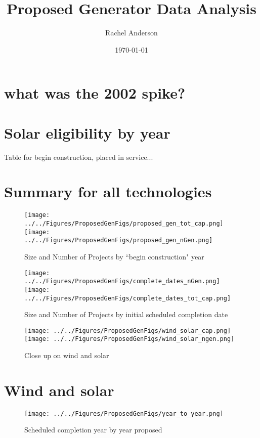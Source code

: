 \documentclass[11pt, oneside]{article}   	%
\title{Proposed Generator Data Analysis}
\author{Rachel Anderson}
\date{\today}							%
\begin{document}
\maketitle

\section{what was the 2002 spike?}

\section{Solar eligibility by year}
Table for begin construction, placed in service... 

\section{Summary for all technologies}
\begin{figure}
\caption{Size and Number of Projects by ``begin construction" year}
\texttt{[image: ../../Figures/ProposedGenFigs/proposed\_gen\_tot\_cap.png]}
\texttt{[image: ../../Figures/ProposedGenFigs/proposed\_gen\_nGen.png]}
\end{figure}

\begin{figure}
\caption{Size and Number of Projects by initial scheduled completion date}
\texttt{[image: ../../Figures/ProposedGenFigs/complete\_dates\_nGen.png]}
\texttt{[image: ../../Figures/ProposedGenFigs/complete\_dates\_tot\_cap.png]}
\end{figure}

\begin{figure}
\caption{Close up on wind and solar} 
\texttt{[image: ../../Figures/ProposedGenFigs/wind\_solar\_cap.png]}
\texttt{[image: ../../Figures/ProposedGenFigs/wind\_solar\_ngen.png]}
\end{figure}



\section{Wind and solar}

\begin{figure}
\caption{Scheduled completion year by year proposed}
\texttt{[image: ../../Figures/ProposedGenFigs/year\_to\_year.png]}
\end{figure}
\end{document}

